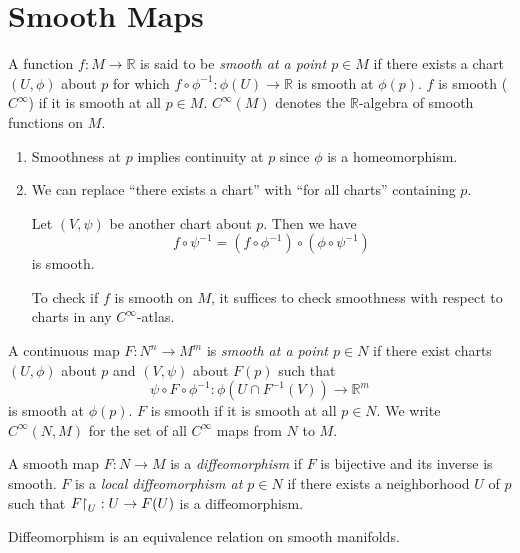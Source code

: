 \section{Smooth Maps}

\begin{defn}
A function $f: M \to \mathbb{R}$ is said to be
\emph{smooth at a point $p \in M$} if there exists a chart
$(U, \phi)$ about $p$ for which
$f \circ \phi^{-1} : \phi(U) \to \mathbb{R}$ is smooth at
$\phi(p)$. $f$ is smooth ($C^\infty$) if it is smooth at all
$p \in M$. $C^\infty(M)$ denotes the $\mathbb{R}$-algebra of smooth
functions on $M$.
\end{defn}

\begin{remark}
  \begin{enumerate}
    \item{
      Smoothness at $p$ implies continuity at $p$ since $\phi$ is a
      homeomorphism.
    }
    \item{
      We can replace ``there exists a chart'' with ``for all charts''
      containing $p$.

      Let $(V, \psi)$ be another chart about $p$. Then we have
      $$
        f \circ \psi^{-1}
      = (f \circ \phi^{-1}) \circ (\phi \circ \psi^{-1})
      $$
      is smooth.

      To check if $f$ is smooth on $M$, it suffices to check
      smoothness with respect to charts in any $C^\infty$-atlas.
    }
  \end{enumerate}
\end{remark}

\begin{defn}
A continuous map $F: N^n \to M^m$ is
\emph{smooth at a point $p \in N$} if there exist charts
$(U, \phi)$ about $p$ and $(V, \psi)$ about $F(p)$ such that
$$
\psi \circ F \circ \phi^{-1} : \phi(U \cap F^{-1}(V)) \to \mathbb{R}^m
$$
is smooth at $\phi(p)$. $F$ is smooth if it is smooth at all $p \in
N$. We write $C^\infty(N, M)$ for the set of all $C^\infty$ maps from
$N$ to $M$.
\end{defn}

\begin{defn}[Diffeomorphism]
A smooth map $F : N \to M$ is a \emph{diffeomorphism} if $F$ is
bijective and its inverse is smooth. $F$ is a
\emph{local diffeomorphism at $p \in N$} if there exists a
neighborhood $U$ of $p$ such that
$F\mathord{\upharpoonright}_U : U \to F(U)$ is a diffeomorphism.
\end{defn}
Diffeomorphism is an equivalence relation on smooth manifolds.

